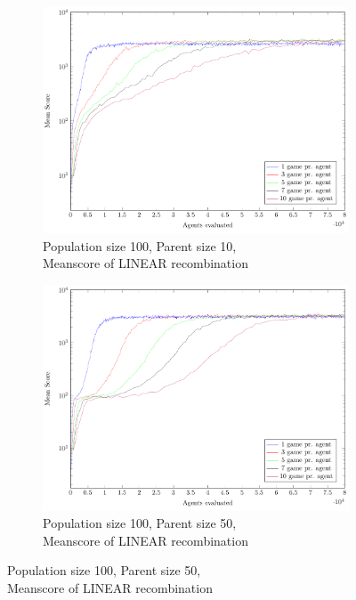 \begin{figure}
\begin{subfigure}[b]{0.45\textwidth}
    \end{subfigure}
    \begin{subfigure}[b]{0.45\textwidth}
    	\centering
    	\caption{Population size 100, Parent size 10, \\ Meanscore of LINEAR recombination}
        \includegraphics[width=\textwidth]{data/cma_population_offspring/100x_split/linear_l100_o10/mean/PlotFile.pdf}
    \end{subfigure}
    \begin{subfigure}[b]{0.45\textwidth}
    	\centering
    	\caption{Population size 100, Parent size 50, \\ Meanscore of LINEAR recombination}
        \includegraphics[width=\textwidth]{data/cma_population_offspring/100x_split/linear_l100_o50/mean/PlotFile.pdf}

\end{subfigure}
\end{figure}
